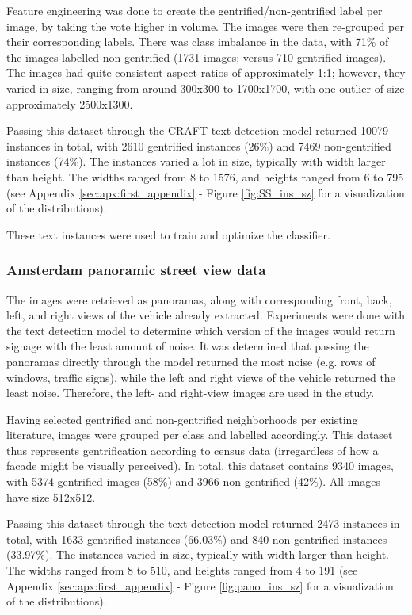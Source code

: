 Feature engineering was done to create the gentrified/non-gentrified label per image, by taking the vote higher in volume. The images were then re-grouped per their corresponding labels. There was class imbalance in the data, with 71\% of the images labelled non-gentrified (1731 images; versus 710 gentrified images). The images had quite consistent aspect ratios of approximately 1:1; however, they varied in size, ranging from around 300x300 to 1700x1700, with one outlier of size approximately 2500x1300.

Passing this dataset through the CRAFT text detection model returned 10079 instances in total, with 2610 gentrified instances (26\%) and 7469 non-gentrified instances (74\%). The instances varied a lot in size, typically with width larger than height. The widths ranged from 8 to 1576, and heights ranged from 6 to 795 (see Appendix \ref{sec:apx:first_appendix} - Figure \ref{fig:SS_ins_sz} for a visualization of the distributions).

These text instances were used to train and optimize the classifier.

\subsubsection{Amsterdam panoramic street view data}
The images were retrieved as panoramas, along with corresponding front, back, left, and right views of the vehicle already extracted. Experiments were done with the text detection model to determine which version of the images would return signage with the least amount of noise. It was determined that passing the panoramas directly through the model returned the most noise (e.g. rows of windows, traffic signs), while the left and right views of the vehicle returned the least noise. Therefore, the left- and right-view images are used in the study.

Having selected gentrified and non-gentrified neighborhoods per existing literature, images were grouped per class and labelled accordingly. This dataset thus represents gentrification according to census data (irregardless of how a facade might be visually perceived). In total, this dataset contains 9340 images, with 5374 gentrified images (58\%) and 3966 non-gentrified (42\%). All images have size 512x512.

Passing this dataset through the text detection model returned 2473 instances in total, with 1633 gentrified instances (66.03\%) and 840 non-gentrified instances (33.97\%). The instances varied in size, typically with width larger than height. The widths ranged from 8 to 510, and heights ranged from 4 to 191 (see Appendix \ref{sec:apx:first_appendix} - Figure \ref{fig:pano_ins_sz} for a visualization of the distributions).

